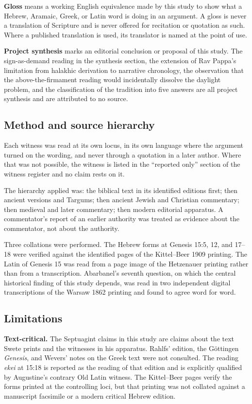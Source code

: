 \textbf{Gloss} means a working English equivalence made by this study to show
what a Hebrew, Aramaic, Greek, or Latin word is doing in an argument. A gloss is
never a translation of Scripture and is never offered for recitation or
quotation as such. Where a published translation is used, its translator is
named at the point of use.

\textbf{Project synthesis} marks an editorial conclusion or proposal of this
study. The sign-as-demand reading in the synthesis section, the extension of Rav
Pappa's limitation from halakhic derivation to narrative chronology, the
observation that the above-the-firmament reading would incidentally dissolve the
daylight problem, and the classification of the tradition into five answers are
all project synthesis and are attributed to no source.

\subsection{Method and source hierarchy}

Each witness was read at its own locus, in its own language where the argument
turned on the wording, and never through a quotation in a later author. Where
that was not possible, the witness is listed in the ``reported only'' section of
the witness register and no claim rests on it.

The hierarchy applied was: the biblical text in its identified editions first;
then ancient versions and Targums; then ancient Jewish and Christian
commentary; then medieval and later commentary; then modern editorial apparatus.
A commentator's report of an earlier authority was treated as evidence about the
commentator, not about the authority.

Three collations were performed. The Hebrew forms at Genesis 15:5, 12, and
17--18 were verified against the identified pages of the Kittel--Beer 1909
printing. The Latin of Genesis 15 was read from a page image of the Hetzenauer
printing rather than from a transcription. Abarbanel's
seventh question, on which the central historical finding of this study depends,
was read in two independent digital transcriptions of the Warsaw 1862 printing
and found to agree word for word.

\subsection{Limitations}

\textbf{Text-critical.} The Septuagint claims in this study are claims about the
text Swete prints and the witnesses in his apparatus. Rahlfs' edition, the
G\"ottingen \textit{Genesis}, and Wevers' notes on the Greek text were not
consulted. The reading \textit{ekei} at 15:18 is reported as the reading of that
edition and is explicitly qualified by Augustine's contrary Old Latin witness.
The Kittel--Beer pages verify the forms printed at the controlling loci, but
that printing was not collated against a manuscript facsimile or a modern
critical Hebrew edition.

